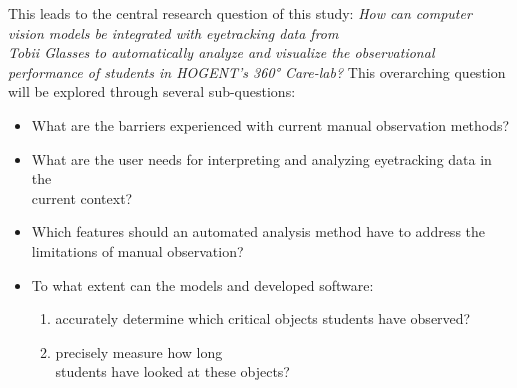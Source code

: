 \documentclass[english]{hogent-article}
\begin{document}
This leads to the central research question of this study:
\textit{How can computer vision models be integrated with eyetracking data from\\ Tobii Glasses to automatically analyze and visualize the observational performance of students in HOGENT's 360° Care-lab?}
This overarching question will be explored through several sub-questions:
\begin{itemize}
  \item What are the barriers experienced with current manual observation methods?
  \item What are the user needs for interpreting and analyzing eyetracking data in the\\ current context?
  \item Which features should an automated analysis method have to address the limitations of manual observation?
  \item To what extent can the models and developed software:
    \begin{enumerate}
      \item accurately determine which critical objects students have observed?
      \item precisely measure how long\\ students have looked at these objects?
    \end{enumerate}
\end{itemize}
\end{document}
